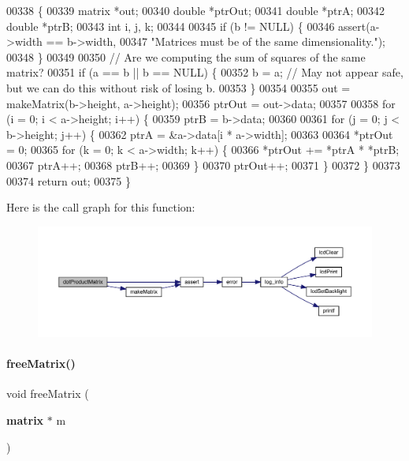 \begin{DoxyCode}
00338                                                \{
00339   matrix *out;
00340   \textcolor{keywordtype}{double} *ptrOut;
00341   \textcolor{keywordtype}{double} *ptrA;
00342   \textcolor{keywordtype}{double} *ptrB;
00343   \textcolor{keywordtype}{int} i, j, k;
00344 
00345   \textcolor{keywordflow}{if} (b != NULL) \{
00346     assert(a->width == b->width,
00347            \textcolor{stringliteral}{"Matrices must be of the same dimensionality."});
00348   \}
00349 
00350   \textcolor{comment}{// Are we computing the sum of squares of the same matrix?}
00351   \textcolor{keywordflow}{if} (a == b || b == NULL) \{
00352     b = a; \textcolor{comment}{// May not appear safe, but we can do this without risk of losing b.}
00353   \}
00354 
00355   out = makeMatrix(b->height, a->height);
00356   ptrOut = out->data;
00357 
00358   \textcolor{keywordflow}{for} (i = 0; i < a->height; i++) \{
00359     ptrB = b->data;
00360 
00361     \textcolor{keywordflow}{for} (j = 0; j < b->height; j++) \{
00362       ptrA = &a->data[i * a->width];
00363 
00364       *ptrOut = 0;
00365       \textcolor{keywordflow}{for} (k = 0; k < a->width; k++) \{
00366         *ptrOut += *ptrA * *ptrB;
00367         ptrA++;
00368         ptrB++;
00369       \}
00370       ptrOut++;
00371     \}
00372   \}
00373 
00374   \textcolor{keywordflow}{return} out;
00375 \}
\end{DoxyCode}
Here is the call graph for this function\+:
\nopagebreak
\begin{figure}[H]
\begin{center}
\leavevmode
\includegraphics[width=350pt]{matrix_8c_a0b568a64e81a56779c2141b424475976_cgraph}
\end{center}
\end{figure}
\mbox{\label{matrix_8c_ae98365c910e9d688d2bdedec50d89a6b}} 
\paragraph{free\+Matrix()}
{\footnotesize\ttfamily void free\+Matrix (\begin{DoxyParamCaption}\item[{\textbf{ matrix} $\ast$}]{m }\end{DoxyParamCaption})}



